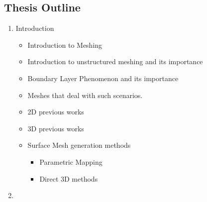 %
\subsection*{Thesis Outline}

\begin{enumerate}
  \item Introduction
    \begin{itemize}
      \item Introduction to Meshing
      \item Introduction to unstructured meshing and its importance
      \item Boundary Layer Phenomenon and its importance
      \item Meshes that deal with such scenarios.
      \item 2D previous works
      \item 3D previous works
      \item Surface Mesh generation methods
        \begin{itemize}
          \item Parametric Mapping
          \item Direct 3D methods
        \end{itemize}
    \end{itemize}
  \item   
\end{enumerate}
\endinput
